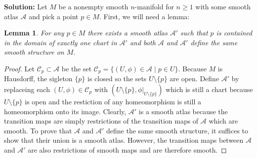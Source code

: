 \documentclass[12pt]{extarticle}
\newcommand{\sm}{\! \setminus \!}
\newtheorem{lemma}[theorem]{Lemma}
\begin{document}
\begin{enumerate}
\textbf{Solution:}
Let $M$ be a nonempty smooth $n$-manifold for $n \ge 1$ with some smooth atlas $\mathcal{A}$ and pick a point $p \in M$. First, we will need a lemma:

\begin{lemma}
For any $p \in M$ there exists a smooth atlas $\mathcal{A'}$ such that $p$ is contained in the domain of exactly one chart in $\mathcal{A}'$ and both $\mathcal{A}$ and $\mathcal{A}'$ define the same smooth structure on $M$. 
\end{lemma}

\begin{proof}
Let $\mathcal{C}_p \subset \mathcal{A}$ be the set $\mathcal{C}_p = \{ (U, \phi) \in \mathcal{A} \mid p \in U\}$. Because $M$ is Hausdorff, the sigleton $\{p\}$ is closed so the sets $U \sm \{p\}$ are open. Define $\mathcal{A'}$ by replaceing each $(U, \phi) \in \mathcal{C}_p$ with $(U \sm \{p\}, \phi|_{U \sm \{p\}} )$ which is still a chart because $U \sm \{p\}$ is open and the restiction of any homeomorphism is still a homeomorphism onto its image. Clearly, $\mathcal{A'}$ is a smooth atlas because the transition maps are simply restrictions of the transition maps of $\mathcal{A}$ which are smooth. To prove that $\mathcal{A}$ and $\mathcal{A'}$ define the same smooth structure, it suffices to show that their union is a smooth atlas. However, the transition maps between $\mathcal{A}$ and $\mathcal{A}'$ are also restrictions of smooth maps and are therefore smooth.   
\end{proof}


\end{enumerate}
\end{document}

